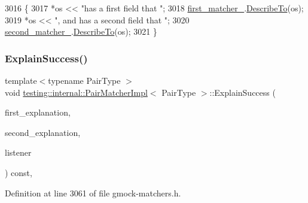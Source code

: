 \begin{DoxyCode}
3016                                                 \{
3017     *os << \textcolor{stringliteral}{"has a first field that "};
3018     \hyperlink{classtesting_1_1internal_1_1PairMatcherImpl_a70e5a952ffd16886f5f1bacc718561f8}{first\_matcher\_}.\hyperlink{classtesting_1_1internal_1_1MatcherBase_a7e0c883c7745e0d646463077ef1c1267}{DescribeTo}(os);
3019     *os << \textcolor{stringliteral}{", and has a second field that "};
3020     \hyperlink{classtesting_1_1internal_1_1PairMatcherImpl_a2341ad72afa02dcadb98c531cada3576}{second\_matcher\_}.\hyperlink{classtesting_1_1internal_1_1MatcherBase_a7e0c883c7745e0d646463077ef1c1267}{DescribeTo}(os);
3021   \}
\end{DoxyCode}
\mbox{\label{classtesting_1_1internal_1_1PairMatcherImpl_ae73fee9c00b8be4b596ad13b8b6eaa09}} 
\subsubsection{\texorpdfstring{Explain\+Success()}{ExplainSuccess()}}
{\footnotesize\ttfamily template$<$typename Pair\+Type $>$ \\
void \hyperlink{classtesting_1_1internal_1_1PairMatcherImpl}{testing\+::internal\+::\+Pair\+Matcher\+Impl}$<$ Pair\+Type $>$\+::Explain\+Success (\begin{DoxyParamCaption}\item[{const \hyperlink{namespacetesting_1_1internal_a8e8ff5b11e64078831112677156cb111}{internal\+::string} \&}]{first\+\_\+explanation,  }\item[{const \hyperlink{namespacetesting_1_1internal_a8e8ff5b11e64078831112677156cb111}{internal\+::string} \&}]{second\+\_\+explanation,  }\item[{\hyperlink{classtesting_1_1MatchResultListener}{Match\+Result\+Listener} $\ast$}]{listener }\end{DoxyParamCaption}) const\hspace{0.3cm}{\ttfamily [inline]}, {\ttfamily [private]}}



Definition at line 3061 of file gmock-\/matchers.\+h.


